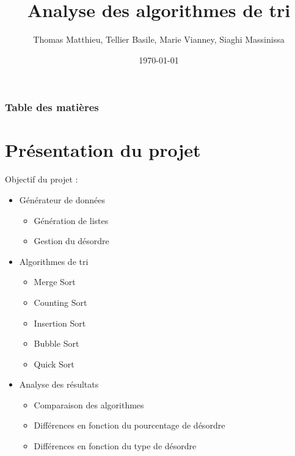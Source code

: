 \documentclass[10pt]{beamer}
\author{Thomas Matthieu, Tellier Basile, Marie Vianney, Siaghi Massinissa}
\date{\today}
\title{Analyse des algorithmes de tri}
\begin{document}
\begin{frame}
\maketitle
\end{frame}

\begin{frame}
\frametitle{Table des matières}
\tableofcontents
\end{frame}

\section{Présentation du projet}
\begin{frame}
Objectif du projet :
  \begin{itemize}
      \item <1-> Générateur de données 
      \begin{itemize}
        \item Génération de listes
        \item Gestion du désordre
      \end{itemize}   
      \item <2-> Algorithmes de tri 
      \begin{itemize}
        \item Merge Sort
        \item Counting Sort
        \item Insertion Sort
        \item Bubble Sort 
        \item Quick Sort 
      \end{itemize}
      \item <3-> Analyse des résultats
        \begin{itemize}
          \item Comparaison des algorithmes 
          \item Différences en fonction du pourcentage de désordre 
          \item Différences en fonction du type de désordre 
        \end{itemize}
  \end{itemize}
\end{frame}
\end{document}
